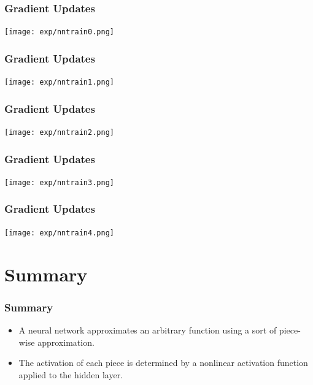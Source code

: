 \documentclass{beamer}
\begin{document}
\begin{frame}
  \frametitle{Gradient Updates}
  \centerline{\texttt{[image: exp/nntrain0.png]}}
\end{frame}  

\begin{frame}
  \frametitle{Gradient Updates}
  \centerline{\texttt{[image: exp/nntrain1.png]}}
\end{frame}  

\begin{frame}
  \frametitle{Gradient Updates}
  \centerline{\texttt{[image: exp/nntrain2.png]}}
\end{frame}  

\begin{frame}
  \frametitle{Gradient Updates}
  \centerline{\texttt{[image: exp/nntrain3.png]}}
\end{frame}  

\begin{frame}
  \frametitle{Gradient Updates}
  \centerline{\texttt{[image: exp/nntrain4.png]}}
\end{frame}  


\section[Summary]{Summary}
\setcounter{subsection}{1}

\begin{frame}
  \frametitle{Summary}
  \begin{itemize}
  \item A neural network approximates an arbitrary function using a sort of piece-wise approximation.
  \item The activation of each piece is determined by a nonlinear activation function applied to
    the hidden layer.
  \end{itemize}
\end{frame}
\end{document}
